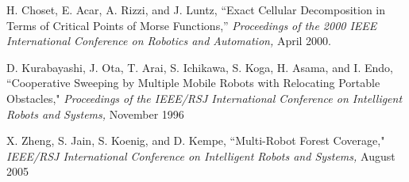 \documentclass[letterpaper, 12pt, leqno]{report}
\begin{document}
\noindent [4] H. Choset, E. Acar, A. Rizzi, and J. Luntz, ``Exact Cellular Decomposition in Terms of Critical Points of Morse Functions,'' \textit{Proceedings of the 2000 IEEE International Conference on Robotics and Automation,} April 2000.

\noindent [5] D. Kurabayashi, J. Ota, T. Arai, S. Ichikawa, S. Koga, H. Asama, and I. Endo, ``Cooperative Sweeping by Multiple Mobile Robots with Relocating Portable Obstacles," \textit{Proceedings of the IEEE/RSJ International Conference on Intelligent Robots and Systems,} November 1996

\noindent [6] X. Zheng, S. Jain, S. Koenig, and D. Kempe, ``Multi-Robot Forest Coverage," \textit{IEEE/RSJ International Conference on Intelligent Robots and Systems,} August 2005


\end{document}
